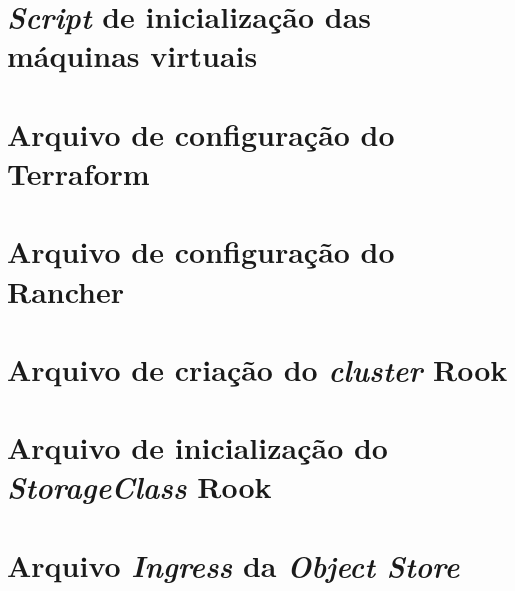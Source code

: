 
\begin{apendicesenv}

\partapendices

\chapter{\textit{Script} de inicialização das máquinas virtuais}
\label{l_startupscript_file}


\chapter{Arquivo de configuração do Terraform}
\label{l_terraform_file}


\chapter{Arquivo de configuração do Rancher}
\label{l_rancher_file}


\chapter{Arquivo de criação do \textit{cluster} Rook}
\label{l_rook-cluster_file}


\chapter{Arquivo de inicialização do \textit{StorageClass} Rook}
\label{l_rook-storage-class_file}


\chapter{Arquivo \textit{Ingress} da \textit{Object Store}}
\label{l_rook-object_ingress_file}


\end{apendicesenv}